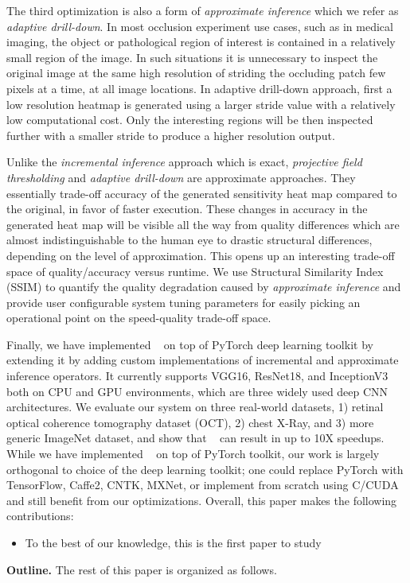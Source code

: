 The third optimization is also a form of \textit{approximate inference} which we refer as \textit{adaptive drill-down}.
In most occlusion experiment use cases, such as in medical imaging, the object or pathological region of interest is contained in a relatively small region of the image.
In such situations it is unnecessary to inspect the original image at the same high resolution of striding the occluding patch few pixels at a time, at all image locations.
In adaptive drill-down approach, first a low resolution heatmap is generated using a larger stride value with a relatively low computational cost.
Only the interesting regions will be then inspected further with a smaller stride to produce a higher resolution output.

Unlike the \textit{incremental inference} approach which is exact, \textit{projective field thresholding} and \textit{adaptive drill-down} are approximate approaches. They essentially trade-off accuracy of the generated sensitivity heat map compared to the original, in favor of faster execution.
These changes in accuracy in the generated heat map will be visible all the way from quality differences which are almost indistinguishable to the human eye to drastic structural differences, depending on the level of approximation.
This opens up an interesting trade-off space of quality/accuracy versus runtime. We use Structural Similarity Index (SSIM) to quantify the quality degradation caused by \textit{approximate inference} and provide user configurable system tuning parameters for easily picking an operational point on the speed-quality trade-off space.

Finally, we have implemented \system~ on top of PyTorch deep learning toolkit by extending it by adding custom implementations of incremental and approximate inference operators.
It currently supports VGG16, ResNet18, and InceptionV3 both on CPU and GPU environments, which are three widely used deep CNN architectures.
We evaluate our system on three real-world datasets, 1) retinal optical coherence tomography dataset (OCT), 2) chest X-Ray, and 3) more generic ImageNet dataset, and show that \system~ can result in up to 10X speedups. While we have implemented \system~ on top of PyTorch toolkit, our work is largely orthogonal to choice of the deep learning toolkit; one could replace PyTorch with TensorFlow, Caffe2, CNTK, MXNet, or implement from scratch using C/CUDA and still benefit from our optimizations.
Overall, this paper makes the following contributions:

\begin{itemize}
	\item To the best of our knowledge, this is the first paper to study
\end{itemize}

\vspace{2mm}
\noindent \textbf{Outline.} The rest of this paper is organized as follows.

